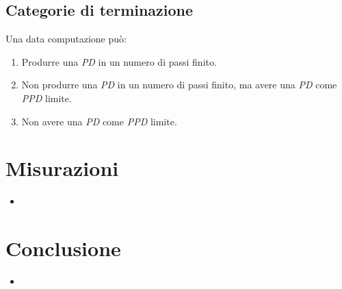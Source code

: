 \documentclass{beamer}
\begin{document}
\subsection{Categorie di terminazione}

\begin{frame}{\subsecname}{}
	Una data computazione può:
	\begin{enumerate}
		\item Produrre una \textit{PD} in un numero di passi finito.
		\item Non produrre una \textit{PD} in un numero di passi finito, ma avere una \textit{PD} come \textit{PPD} limite.
		\item Non avere una \textit{PD} come \textit{PPD} limite.
	\end{enumerate}
\end{frame}

\section{Misurazioni}

\begin{frame}{\secname}{}
	\begin{itemize}
		\item
	\end{itemize}
\end{frame}

\section{Conclusione}

\begin{frame}{\secname}{}
	\begin{itemize}
		\item
	\end{itemize}
\end{frame}
\end{document}
